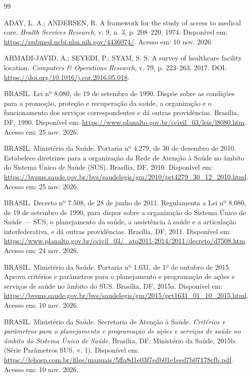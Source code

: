 \documentclass[12pt,a4paper,oneside]{report}
\begin{document}
\begin{thebibliography}{99}

ADAY, L. A.; ANDERSEN, R. A framework for the study of access to medical care. \textit{Health Services Research}, v. 9, n. 3, p. 208--220, 1974. Disponível em: \url{https://pubmed.ncbi.nlm.nih.gov/4436074/}. Acesso em: 10 nov. 2026.

AHMADI-JAVID, A.; SEYEDI, P.; SYAM, S. S. A survey of healthcare facility location. \textit{Computers \& Operations Research}, v. 79, p. 223--263, 2017. DOI: \url{https://doi.org/10.1016/j.cor.2016.05.018}.

BRASIL. Lei nº 8.080, de 19 de setembro de 1990. Dispõe sobre as condições para a promoção, proteção e recuperação da saúde, a organização e o funcionamento dos serviços correspondentes e dá outras providências. Brasília, DF, 1990. Disponível em: \url{https://www.planalto.gov.br/ccivil_03/leis/l8080.htm}. Acesso em: 25 nov. 2026.

BRASIL. Ministério da Saúde. Portaria nº 4.279, de 30 de dezembro de 2010. Estabelece diretrizes para a organização da Rede de Atenção à Saúde no âmbito do Sistema Único de Saúde (SUS). Brasília, DF, 2010. Disponível em: \url{https://bvsms.saude.gov.br/bvs/saudelegis/gm/2010/prt4279_30_12_2010.html}. Acesso em: 25 nov. 2026.

BRASIL. Decreto nº 7.508, de 28 de junho de 2011. Regulamenta a Lei nº 8.080, de 19 de setembro de 1990, para dispor sobre a organização do Sistema Único de Saúde --- SUS, o planejamento da saúde, a assistência à saúde e a articulação interfederativa, e dá outras providências. Brasília, DF, 2011. Disponível em: \url{https://www.planalto.gov.br/ccivil_03/_ato2011-2014/2011/decreto/d7508.htm}. Acesso em: 24 nov. 2026.

BRASIL. Ministério da Saúde. Portaria nº 1.631, de 1º de outubro de 2015. Aprova critérios e parâmetros para o planejamento e programação de ações e serviços de saúde no âmbito do SUS. Brasília, DF, 2015a. Disponível em: \url{https://bvsms.saude.gov.br/bvs/saudelegis/gm/2015/prt1631_01_10_2015.html}. Acesso em: 10 nov. 2026.

BRASIL. Ministério da Saúde. Secretaria de Atenção à Saúde. \textit{Critérios e parâmetros para o planejamento e programação de ações e serviços de saúde no âmbito do Sistema Único de Saúde}. Brasília, DF: Ministério da Saúde, 2015b. (Série Parâmetros SUS, v. 1). Disponível em: \url{https://fehosp.com.br/files/manuais/5ffa8d1e03f7edb01e1eed7b07178cfb.pdf}. Acesso em: 10 nov. 2026.


\end{thebibliography}
\end{document}
